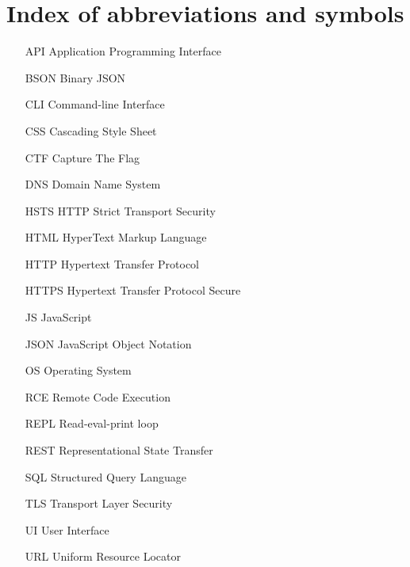 
\chapter{Index of abbreviations and symbols}

\begin{itemize}
	\item[API] Application Programming Interface
	\item[BSON] Binary JSON
	\item[CLI] Command-line Interface
	\item[CSS] Cascading Style Sheet
	\item[CTF] Capture The Flag
	\item[DNS] Domain Name System
	\item[HSTS] HTTP Strict Transport Security
	\item[HTML] HyperText Markup Language
	\item[HTTP] Hypertext Transfer Protocol
	\item[HTTPS] Hypertext Transfer Protocol Secure
	\item[JS] JavaScript
	\item[JSON] JavaScript Object Notation
	\item[OS] Operating System
	\item[RCE] Remote Code Execution
	\item[REPL] Read-eval-print loop
	\item[REST] Representational State Transfer
	\item[SQL] Structured Query Language
	\item[TLS] Transport Layer Security
	\item[UI] User Interface
	\item[URL] Uniform Resource Locator
\end{itemize}
